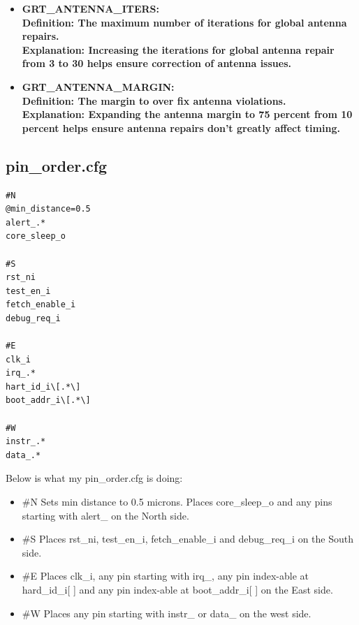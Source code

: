 \documentclass{article}
\begin{document}
\begin{flushleft}
\begin{itemize}
\item \bf{GRT\_ANTENNA\_ITERS:}
\\Definition: The maximum number of iterations for global antenna repairs.
\\Explanation: Increasing the iterations for global antenna repair from 3 to 30 helps ensure correction of antenna issues. 
\item \bf{GRT\_ANTENNA\_MARGIN:}
\\Definition: The margin to over fix antenna violations.
\\Explanation: Expanding the antenna margin to 75 percent from 10 percent helps ensure antenna repairs don't greatly affect timing.
\end{itemize}
\noindent\makebox[\linewidth]{\rule{\paperwidth}{0.4pt}}
\subsection{pin\_order.cfg}
\begin{lstlisting}
#N
@min_distance=0.5
alert_.*
core_sleep_o

#S
rst_ni
test_en_i
fetch_enable_i
debug_req_i

#E
clk_i
irq_.*
hart_id_i\[.*\]
boot_addr_i\[.*\]

#W
instr_.*
data_.*
\end{lstlisting}
\noindent\makebox[\linewidth]{\rule{\paperwidth}{0.4pt}}
{\large Below is what my pin\_order.cfg is doing:}
\begin{itemize}
\item \#N Sets min distance to 0.5 microns. Places core\_sleep\_o and any pins starting with alert\_ on the North side.
\item \#S Places rst\_ni, test\_en\_i, fetch\_enable\_i and debug\_req\_i on the South side.
\item \#E Places clk\_i, any pin starting with irq\_, any pin index-able at hard\_id\_i[ ] and any pin index-able at boot\_addr\_i[ ] on the East side.
\item \#W Places any pin starting with instr\_ or data\_ on the west side.
\end{itemize}
\noindent\makebox[\linewidth]{\rule{\paperwidth}{0.4pt}}

\end{flushleft}
\end{document}
